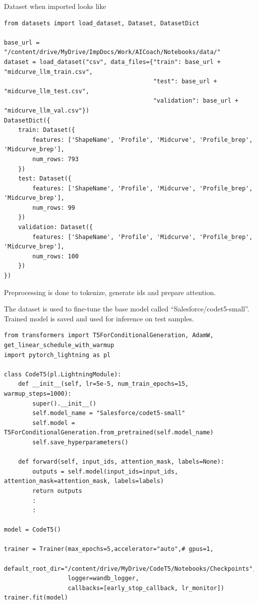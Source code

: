 \documentclass[10pt, conference]{IEEEtran}
\begin{document}
Dataset when imported looks like


\begin{lstlisting}[basicstyle=\tiny, breaklines=true, breakatwhitespace=true,label=lst:python]
from datasets import load_dataset, Dataset, DatasetDict

base_url = "/content/drive/MyDrive/ImpDocs/Work/AICoach/Notebooks/data/"
dataset = load_dataset("csv", data_files={"train": base_url + "midcurve_llm_train.csv",
                                          "test": base_url + "midcurve_llm_test.csv",
                                          "validation": base_url + "midcurve_llm_val.csv"})
DatasetDict({
    train: Dataset({
        features: ['ShapeName', 'Profile', 'Midcurve', 'Profile_brep', 'Midcurve_brep'],
        num_rows: 793
    })
    test: Dataset({
        features: ['ShapeName', 'Profile', 'Midcurve', 'Profile_brep', 'Midcurve_brep'],
        num_rows: 99
    })
    validation: Dataset({
        features: ['ShapeName', 'Profile', 'Midcurve', 'Profile_brep', 'Midcurve_brep'],
        num_rows: 100
    })
})

\end{lstlisting}

Preprocessing is done to tokenize, generate ids and prepare attention.

%    

The dataset is used to fine-tune the base model called ``Salesforce/codet5-small''. Trained model is saved and used for inference on test samples.

\begin{lstlisting}[basicstyle=\tiny, breaklines=true, breakatwhitespace=true,label=lst:python]
from transformers import T5ForConditionalGeneration, AdamW, get_linear_schedule_with_warmup
import pytorch_lightning as pl

class CodeT5(pl.LightningModule):
    def __init__(self, lr=5e-5, num_train_epochs=15, warmup_steps=1000):
        super().__init__()
        self.model_name = "Salesforce/codet5-small"
        self.model = T5ForConditionalGeneration.from_pretrained(self.model_name)
        self.save_hyperparameters()
        
    def forward(self, input_ids, attention_mask, labels=None):
        outputs = self.model(input_ids=input_ids, attention_mask=attention_mask, labels=labels)
        return outputs        
        :
        :

model = CodeT5()

trainer = Trainer(max_epochs=5,accelerator="auto",# gpus=1,
                  default_root_dir="/content/drive/MyDrive/CodeT5/Notebooks/Checkpoints",
                  logger=wandb_logger,
                  callbacks=[early_stop_callback, lr_monitor])
trainer.fit(model)
\end{lstlisting}
\end{document}
